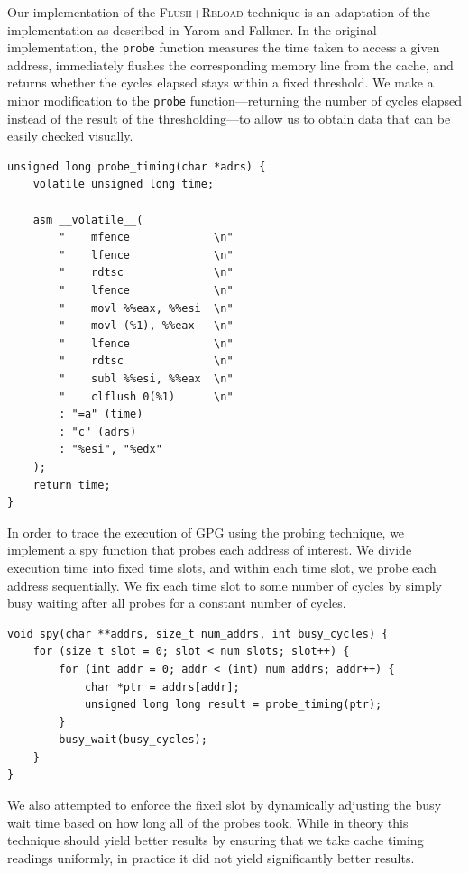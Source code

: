 \documentclass[11pt]{llncs}
\newcommand{\flushreload}{\textsc{Flush}+\textsc{Reload}}
\begin{document}
Our implementation of the \flushreload{} technique is an adaptation of the
implementation as described in Yarom and Falkner\cite{YF13}. In the original
implementation, the \texttt{probe} function measures the time taken to access a
given address, immediately flushes the corresponding memory line from the cache, and returns
whether the cycles elapsed stays within a fixed threshold.  We make a minor
modification to the \texttt{probe} function---returning the number of cycles
elapsed instead of the result of the thresholding---to allow us to obtain data
that can be easily checked visually.

\begin{lstlisting}[caption={Our trivially modified probe function}]
unsigned long probe_timing(char *adrs) {
    volatile unsigned long time;

    asm __volatile__(
        "    mfence             \n"
        "    lfence             \n"
        "    rdtsc              \n"
        "    lfence             \n"
        "    movl %%eax, %%esi  \n"
        "    movl (%1), %%eax   \n"
        "    lfence             \n"
        "    rdtsc              \n"
        "    subl %%esi, %%eax  \n"
        "    clflush 0(%1)      \n"
        : "=a" (time)
        : "c" (adrs)
        : "%esi", "%edx"
    );
    return time;
}
\end{lstlisting}

In order to trace the execution of GPG using the probing technique, we implement
a spy function that probes each address of interest. We divide execution time
into fixed time slots, and within each time slot, we probe each address
sequentially. We fix each time slot to some number of cycles by simply busy
waiting after all probes for a constant number of cycles.

\begin{lstlisting}[caption={Our spy function. Some minor details removed for
                            brevity}]
void spy(char **addrs, size_t num_addrs, int busy_cycles) {
    for (size_t slot = 0; slot < num_slots; slot++) {
        for (int addr = 0; addr < (int) num_addrs; addr++) {
            char *ptr = addrs[addr];
            unsigned long long result = probe_timing(ptr);
        }
        busy_wait(busy_cycles);
    }
}
\end{lstlisting}

We also attempted to enforce the fixed slot by dynamically adjusting the busy
wait time based on how long all of the probes took. While in theory this
technique should yield better results by ensuring that we take cache timing
readings uniformly, in practice it did not yield significantly better
results.
\end{document}
